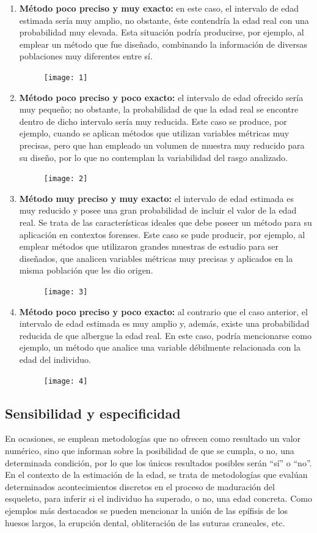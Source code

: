 \documentclass[a4paper,11pt]{article}
\begin{document}
\begin{enumerate}
\item {\bf Método poco preciso y muy exacto:} en este caso, el intervalo de edad estimada sería muy amplio, no obstante, éste contendría la edad real con una probabilidad muy elevada. Esta situación podría producirse, por ejemplo, al emplear un método que fue diseñado, combinando la información de diversas poblaciones muy diferentes entre sí.
\begin{figure}[h!]
\centering
\texttt{[image: 1]}
\end{figure}
\item {\bf Método poco preciso y poco exacto:} el intervalo de edad ofrecido sería muy pequeño; no obstante, la probabilidad de que la edad real se encontre dentro de dicho intervalo sería muy reducida. Este caso se produce, por ejemplo, cuando se aplican métodos que utilizan variables métricas muy precisas, pero que han empleado un volumen de muestra muy reducido para su diseño, por lo que no contemplan la variabilidad del rasgo analizado.
\begin{figure}[h!]
\centering
\texttt{[image: 2]}
\end{figure}
\item {\bf Método muy preciso y muy exacto:} el intervalo de edad estimada es muy reducido y posee una gran probabilidad de incluir el valor de la edad real. Se trata de las características ideales que debe poseer un método para su aplicación en contextos forenses. Este caso se pude producir, por ejemplo, al emplear métodos que utilizaron grandes muestras de estudio para ser diseñados, que analicen variables métricas muy precisas y aplicados en la misma población que les dio origen.
\begin{figure}[h!]
\centering
\texttt{[image: 3]}
\end{figure}
\item {\bf Método poco preciso y poco exacto:} al contrario que el caso anterior, el intervalo de edad estimada es muy amplio y, además, existe una probabilidad reducida de que albergue la edad real. En este caso, podría mencionarse como ejemplo, un método que analice una variable débilmente relacionada con la edad del individuo.
\begin{figure}[h!]
\centering
\texttt{[image: 4]}
\end{figure}
\end{enumerate}

\subsection{Sensibilidad y especificidad}
En ocasiones, se emplean metodologías que no ofrecen como resultado un valor numérico, sino que informan sobre la posibilidad de que se cumpla, o no, una determinada condición, por lo que los únicos resultados posibles serán “sí” o “no”. En el contexto de la estimación de la edad, se trata de metodologías que evalúan determinados acontecimientos discretos en el proceso de maduración del esqueleto, para inferir si el individuo ha superado, o no, una edad concreta. Como ejemplos más destacados se pueden mencionar la unión de las epífisis de los huesos largos, la erupción dental, obliteración de las suturas craneales, etc.
\end{document}
